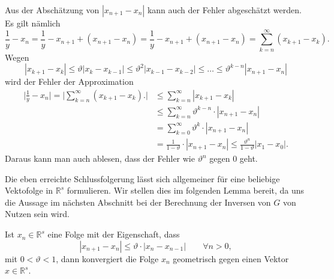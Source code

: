 Aus der Abschätzung von $|x_{n+1}-x_n|$ kann auch der Fehler
abgeschätzt werden.
Es gilt nämlich
\[
\frac1y
-
x_n
=
\frac1y - x_{n+1} + (x_{n+1} - x_n)
=
\frac1y - x_{n+1} + (x_{n+1} - x_n)
=
\sum_{k=n}^\infty(x_{k+1}-x_k).
\]
Wegen
\[
|x_{k+1} - x_k|
\le
\vartheta | x_{k}-x_{k-1}|
\le
\vartheta^2 | x_{k-1}-x_{k-2}|
\le \dots
\le
\vartheta^{k-n} |x_{n+1}-x_{n}|
\]
wird der Fehler der Approximation
\begin{align*}
\biggl|
\frac1y
-
x_n
\biggr|
=
\biggl|
\sum_{k=n}^\infty(x_{k+1}-x_k).
\biggr|
&\le
\sum_{k=n}^\infty|x_{k+1}-x_k|
\\
&\le
\sum_{k=n}^\infty \vartheta^{k-n} \cdot |x_{n+1}-x_n|
\\
&=
\sum_{k=0}^\infty \vartheta^k \cdot |x_{n+1}-x_n|
\\
&=
\frac1{1-\vartheta}\cdot |x_{n+1}-x_n|
\le
\frac{\vartheta^n}{1-\vartheta} |x_1-x_0|.
\end{align*}
Daraus kann man auch ablesen, dass der Fehler wie $\vartheta^n$ gegen $0$
geht.

Die eben erreichte Schlussfolgerung lässt sich allgemeiner für eine
beliebige Vektofolge in $\mathbb R^s$ formulieren.
Wir stellen dies im folgenden Lemma bereit, da uns die Aussage
im nächsten Abschnitt bei der Berechnung der Inversen von $G$ 
von Nutzen sein wird.

\begin{lemma}
\label{lemma:konvergenz}
Ist $x_n\in\mathbb R^s$ eine Folge mit der Eigenschaft, dass 
\[
|x_{n+1}-x_n| \le \vartheta\cdot|x_n-x_{n-1}|
\qquad
\forall n > 0,
\]
mit $0 < \vartheta  < 1$, dann konvergiert die Folge $x_n$ geometrisch
gegen einen Vektor $x\in\mathbb R^s$.
\end{lemma}

